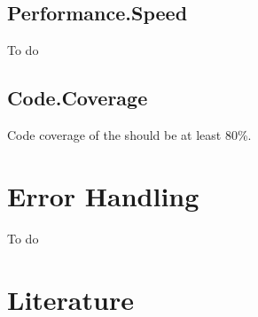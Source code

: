 \documentclass[signature]{deltares_report}
\begin{document}
\section{Performance.Speed}
\label{sec:PerformanceSpeed}
To do

\section{Code.Coverage}
\label{sec:CodeCoverage}
Code coverage of the \ProgramName should be at least 80\%.

\chapter{Error Handling}
\label{sec:ErrorHandling}
To do

\chapter{Literature}  \label{chapterLiterature}



\pagestyle{empty}
\mbox{}

\end{document}
